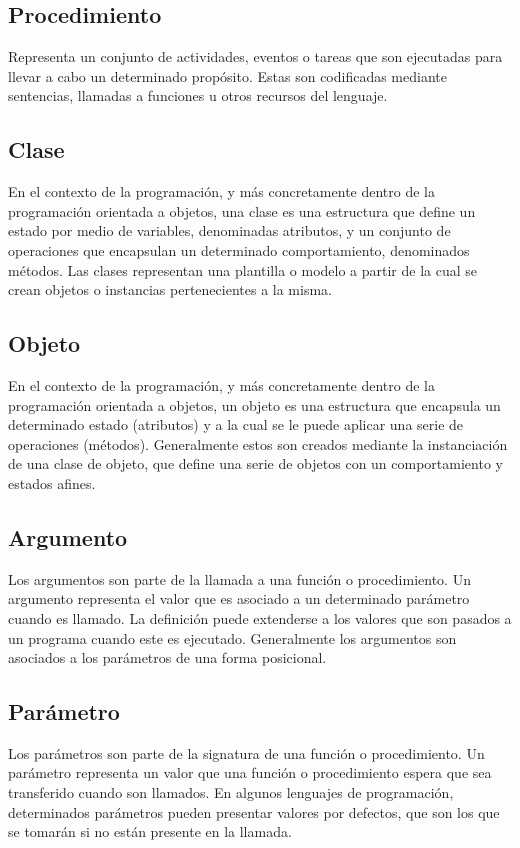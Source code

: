 \subsection{Procedimiento}
Representa un conjunto de actividades, eventos o tareas que son ejecutadas para llevar a cabo un determinado propósito. Estas son codificadas mediante sentencias, llamadas a funciones
u otros recursos del lenguaje. 

\subsection{Clase}
En el contexto de la programación, y más concretamente dentro de la programación orientada a objetos, una clase es una estructura que define un estado por medio de variables, 
denominadas atributos, y un conjunto de operaciones que encapsulan un determinado comportamiento, denominados métodos. Las clases representan una plantilla o modelo a partir de 
la cual se crean objetos o instancias pertenecientes a la misma. 

\subsection {Objeto}
En el contexto de la programación, y más concretamente dentro de la programación orientada a objetos, un objeto es una estructura que encapsula un determinado estado (atributos) y a la 
cual se le puede aplicar una serie de operaciones (métodos). Generalmente estos son creados mediante la instanciación de una clase de objeto, que define una serie de objetos con un comportamiento y estados afines.

\subsection {Argumento}
Los argumentos son parte de la llamada a una función o procedimiento. Un argumento representa el valor que es asociado a un determinado parámetro cuando es llamado. La definición puede extenderse a los valores que son pasados
a un programa cuando este es ejecutado. Generalmente los argumentos son asociados a los parámetros de una forma posicional.

\subsection {Parámetro}
Los parámetros son parte de la signatura de una función o procedimiento. Un parámetro representa un valor que una función o procedimiento espera que sea transferido cuando son llamados. En 
algunos lenguajes de programación, determinados parámetros pueden presentar valores por defectos, que son los que se tomarán si no están presente en la llamada.

